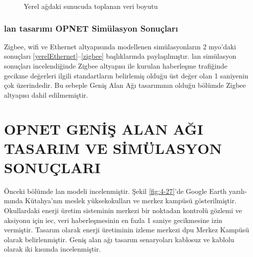 \begin{figure}[htbp]


\centering


\caption{Yerel ağdaki sunucuda toplanan veri boyutu}
\label{fig:4-26}
\end{figure}


\newpage
\subsubsection{\gls{lan} tasarımı OPNET Simülasyon Sonuçları}


Zigbee, \gls{wifi} ve Ethernet altyapısında modellenen simülasyonların 2 \gls{myo}'daki sonuçları \ref{yerelEthernet}--\ref{zigbee} başlıklarında paylaşılmıştır. \gls{lan} simülasyon sonuçları incelendiğinde Zigbee altyapısı ile kurulan haberleşme trafiğinde gecikme değerleri ilgili standartların belirlemiş olduğu üst değer olan 1 saniyenin çok üzerindedir. Bu sebeple Geniş Alan Ağı tasarımının olduğu bölümde Zigbee altyapısı dahil edilmemiştir.

\section{OPNET GENİŞ ALAN AĞI TASARIM VE SİMÜLASYON SONUÇLARI}

Önceki bölümde \gls{lan} modeli incelenmiştir. Şekil \ref{fig:4-27}’de Google Earth yazılı-mında Kütahya’nın meslek yüksekokulları ve merkez kampüsü gösterilmiştir. Okullardaki enerji üretim sisteminin merkezi bir noktadan kontrolü gözlemi ve aksiyonu için \gls{iec}, veri haberleşmesinin en fazla 1 saniye gecikmesine izin vermiştir. Tasarım olarak enerji üretiminin izleme merkezi \gls{dpu} Merkez Kampüsü olarak belirlenmiştir. Geniş alan ağı tasarım senaryoları kablosuz ve kablolu olarak iki kısımda incelenmiştir.



